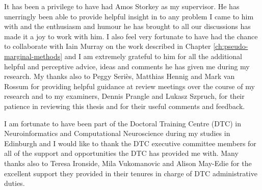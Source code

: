 
\enlargethispage{2\baselineskip}



It has been a privilege to have had Amos Storkey as my supervisor. He has unerringly been able to provide helpful insight in to any problem I came to him with and the enthusiasm and humour he has brought to all our discussions has made it a joy to work with him. I also feel very fortunate to have had the chance to collaborate with Iain Murray on the work described in Chapter \ref{ch:pseudo-marginal-methods} and I am extremely grateful to him for all the additional helpful and perceptive advice, ideas and comments he has given me during my research. My thanks also to Peggy Seri\`{e}s, Matthias Hennig and Mark van Rossum for providing helpful guidance at review meetings over the course of my research and to my examiners, Dennis Prangle and Lukasz Szpruch, for their patience in reviewing this thesis and for their useful comments and feedback.




I am fortunate to have been part of the Doctoral Training Centre (DTC) in Neuroinformatics and Computational Neuroscience during my studies in Edinburgh and I would like to thank the DTC executive committee members for all of the support and opportunities the DTC has provided me with. Many thanks also to Teresa Ironside, Mila Vukomanovic and Alison May-Edie for the excellent support they provided in their tenures in charge of DTC administrative duties.

